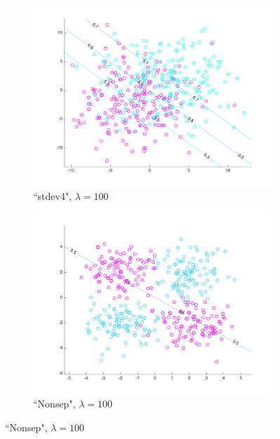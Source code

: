 \begin{figure}[h!]
\begin{subfigure}[b]{0.22\textwidth}
	\includegraphics[scale=0.25]{hw2_1_stdev4_a_100.pdf}
	\caption{``stdev4", $\lambda = 100$}\label{fig:data_stdev4_a_100}
    \end{subfigure}  
    \quad
    \begin{subfigure}[b]{0.22\textwidth}
	\includegraphics[scale=0.25]{hw2_1_nonsep_a_100.pdf}
	\caption{``Nonsep", $\lambda = 100$}\label{fig:data_nonsep_a_100}
    \end{subfigure}  
    

\end{figure}
